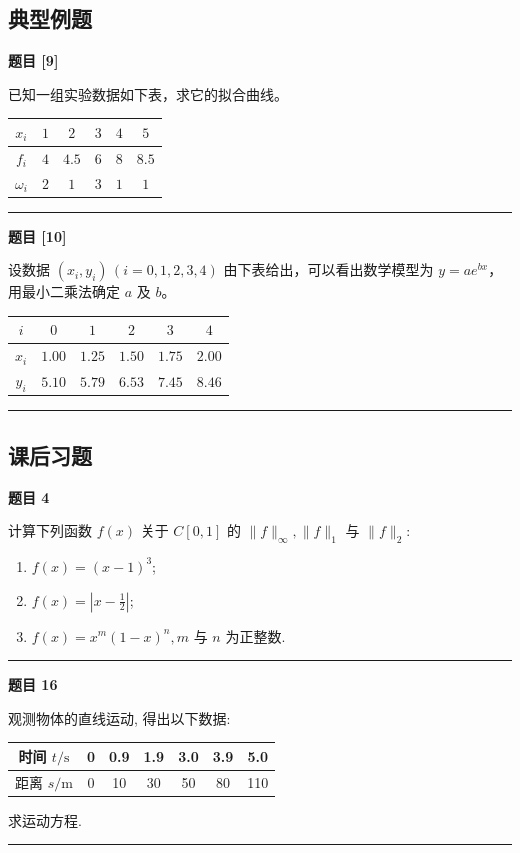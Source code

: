 \documentclass[a4paper,12pt]{ctexart}
\newcommand{\problem}[1]{
    \par\noindent\textbf{题目 #1} \quad
}
\newcommand{\workspace}[1][5cm]{
    \par
    \vspace{#1}
    \noindent\rule{\textwidth}{0.1pt} %
    \vspace{0.5em}
    \par
}
\begin{document}
\subsection*{典型例题}

\problem{[9]}
已知一组实验数据如下表，求它的拟合曲线。
\begin{table}[H]
\centering
\begin{tabular}{c c c c c c}
\toprule
$x_i$ & $1$ & $2$ & $3$ & $4$ & $5$ \\
\midrule
$f_i$ & $4$ & $4.5$ & $6$ & $8$ & $8.5$ \\
$\omega_i$ & $2$ & $1$ & $3$ & $1$ & $1$ \\
\bottomrule
\end{tabular}
\end{table}
\workspace[8cm]

\problem{[10]}
设数据 $(x_i, y_i) \, (i=0, 1, 2, 3, 4)$ 由下表给出，可以看出数学模型为 $y = ae^{bx}$，用最小二乘法确定 $a$ 及 $b$。
\begin{table}[H]
\centering
\begin{tabular}{c c c c c c}
\toprule
$i$ & $0$ & $1$ & $2$ & $3$ & $4$ \\
\midrule
$x_i$ & $1.00$ & $1.25$ & $1.50$ & $1.75$ & $2.00$ \\
$y_i$ & $5.10$ & $5.79$ & $6.53$ & $7.45$ & $8.46$ \\
\bottomrule
\end{tabular}
\end{table}
\workspace[8cm]

\subsection*{课后习题}

\problem{4}
计算下列函数 $f(x)$ 关于 $C[0,1]$ 的 $\|f\|_\infty, \|f\|_1$ 与 $\|f\|_2$:
\begin{enumerate}
    \item $f(x) = (x-1)^3$;
    \item $f(x) = \left| x - \frac{1}{2} \right|$;
    \item $f(x) = x^m(1-x)^n, m$ 与 $n$ 为正整数.
\end{enumerate}
\workspace[10cm]

\problem{16}
观测物体的直线运动, 得出以下数据:
\begin{center}
\begin{tabular}{c|c|c|c|c|c|c}
\toprule
时间 $t/\text{s}$ & 0 & 0.9 & 1.9 & 3.0 & 3.9 & 5.0 \\
\midrule
距离 $s/\text{m}$ & 0 & 10 & 30 & 50 & 80 & 110 \\
\bottomrule
\end{tabular}
\end{center}
求运动方程.
\workspace[6cm]
\end{document}
